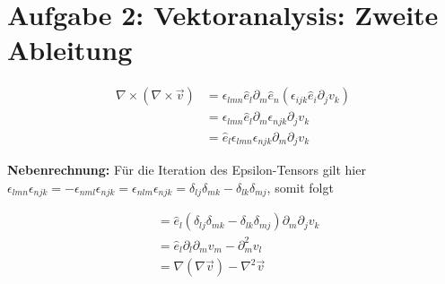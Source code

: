 \documentclass[a4paper,german,12pt,smallheadings]{scrartcl}
\begin{document}
\section*{Aufgabe 2: Vektoranalysis: Zweite Ableitung}

\begin{align*}
     \nabla \times (\nabla \times \vec{v})
     &= \epsilon_{lmn} \hat{e}_l \partial_m \hat{e}_n (\epsilon_{ijk} \hat{e}_i \partial_j v_k) \\
     &= \epsilon_{lmn} \hat{e}_l \partial_m \epsilon_{njk} \partial_j v_k \\
     &= \hat{e}_l \epsilon_{lmn} \epsilon_{njk} \partial_m \partial_j v_k
\end{align*}

\textbf{Nebenrechnung:} Für die Iteration des Epsilon-Tensors gilt hier $
  \epsilon_{lmn} \epsilon_{njk} = -\epsilon_{nml} \epsilon_{njk}
  = \epsilon_{nlm} \epsilon_{njk}
  = \delta_{lj}\delta_{mk} - \delta_{lk}\delta_{mj}
$, somit folgt

\begin{align*}
  &= \hat{e}_l (\delta_{lj}\delta_{mk} - \delta_{lk}\delta_{mj}) \partial_m \partial_j v_k \\
  &= \hat{e}_l \partial_l \partial_m v_m - \partial_m^2 v_l \\
  &= \nabla(\nabla \vec{v}) - \nabla^2 \vec{v}
\end{align*}
\end{document}
